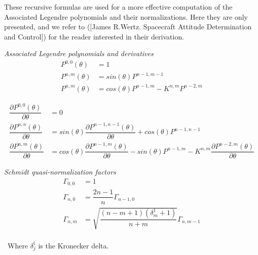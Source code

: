 These recursive formulas are used for a more effective computation of the Associated Legendre polynomials and their normalizations. Here they are only presented, and we refer to ([James R.Wertz. Spacecraft Attitude Determination and Control]) for the reader interested in their derivation.

{\it Associated Legendre polynomials and derivatives}
\begin{equation} \label{eq:Legendre_Recursive}
\begin{aligned}
P^{0,0}(\theta) &= 1\\
P^{n,m}(\theta) &= sin(\theta)P^{n-1,m-1}\\
P^{n,m}(\theta) &= cos(\theta)P^{n-1,m} - K^{n,m}P^{n-2,m}
\end{aligned}
\end{equation}

\begin{equation} \label{eq:dLegendre_Recursive}
\begin{aligned}
\dfrac{\partial P^{0,0}(\theta)}{\partial \theta} &= 0\\
\dfrac{\partial P^{n,n}(\theta)}{\partial \theta} &= sin(\theta)\dfrac{\partial P^{n-1,n-1}(\theta)}{\partial \theta} + cos(\theta)P^{n-1,n-1}\\
\dfrac{\partial P^{n,m}(\theta)}{\partial \theta} &= cos(\theta)\dfrac{\partial P^{n-1,m}(\theta)}{\partial \theta} - sin(\theta)P^{n-1,m} - K^{n,m}\dfrac{\partial P^{n-2,m}(\theta)}{\partial \theta}
\end{aligned}
\end{equation}


{\it Schmidt quasi-normalization factors}
\begin{equation}
\begin{aligned}
\Gamma_{0,0} &= 1\\
\Gamma_{n,0} &= \dfrac{2n-1}{n}\Gamma_{n-1,0}\\
\Gamma_{n,m} &= \sqrt{\dfrac{(n-m+1)(\delta_m^1+1)}{n+m}}\Gamma_{n,m-1}
\end{aligned}
\end{equation} ~\\
~Where $\delta_j^î$ is the Kronecker delta.~\\


